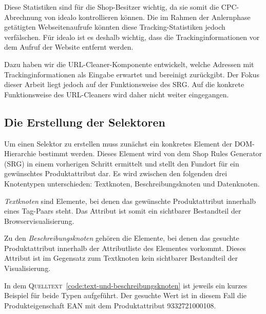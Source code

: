 Diese Statistiken sind für die Shop-Besitzer wichtig, da sie somit die CPC-Abrechnung von idealo kontrollieren
können.
Die im Rahmen der Anlernphase getätigten Webseitenaufrufe könnten diese Tracking-Statistiken jedoch verfälschen.
Für idealo ist es deshalb wichtig, dass die Trackinginformationen vor dem Aufruf der Website entfernt werden.

Dazu haben wir die URL-Cleaner-Komponente entwickelt, welche Adressen mit Trackinginformationen als Eingabe erwartet und
bereinigt zurückgibt.
Der Fokus dieser Arbeit liegt jedoch auf der Funktionsweise des SRG.
Auf die konkrete Funktionsweise des URL-Cleaners wird daher nicht weiter eingegangen.

\subsection{Die Erstellung der Selektoren}
\label{subsec:erstellen-von-selektoren}

Um einen Selektor zu erstellen muss zunächst ein konkretes Element der DOM-Hierarchie bestimmt werden.
Dieses Element wird von dem Shop Rules Generator (SRG) in einem vorherigen Schritt ermittelt und stellt den Fundort für
ein gewünschtes Produktattribut dar.
Es wird zwischen den folgenden drei Knotentypen unterschieden: Textknoten, Beschreibungsknoten und Datenknoten.

\textit{Textknoten} sind Elemente, bei denen das gewünschte Produktattribut innerhalb eines Tag-Paars steht.
Das Attribut ist somit ein sichtbarer Bestandteil der Browservisualisierung.

Zu den \textit{Beschreibungsknoten} gehören die Elemente, bei denen das gesuchte Produktattribut innerhalb der
Attributliste des Elementes vorkommt.
Dieses Attribut ist im Gegensatz zum Textknoten kein sichtbarer Bestandteil der Visualisierung.

In dem \textsc{Quelltext}~\ref{code:text-und-beschreibungsknoten} ist jeweils ein kurzes Beispiel für beide Typen aufgeführt.
Der gesuchte Wert ist in diesem Fall die Produkteigenschaft EAN mit dem Produktattribut 9332721000108.

